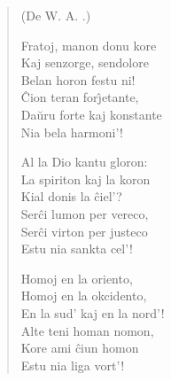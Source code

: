 \begin{verse}
\begin{center}
\footnotesize (De W. A. .)
\end{center}

                        Fratoj, manon donu kore\\
                        Kaj senzorge, sendolore\\
                        Belan horon festu ni!\\
                        \^Cion teran for\^{\j}etante,\\
                        Da\u uru forte kaj konstante\\
                        Nia bela harmoni'!

                        Al la Dio kantu gloron:\\
                        La spiriton kaj la koron\\
                        Kial donis la \^ciel'?\\
                        Ser\^ci lumon per vereco,\\
                        Ser\^ci virton per justeco\\
                        Estu nia sankta cel'!

                        Homoj en la oriento,\\
                        Homoj en la okcidento,\\
                        En la sud' kaj en la nord'!\\
                        Alte teni homan nomon,\\
                        Kore ami \^ciun homon\\
                        Estu nia liga vort'!

\end{verse}


\smallrule{}
